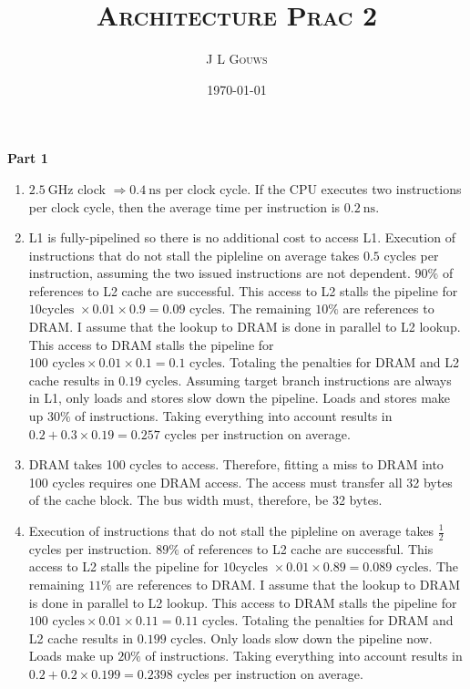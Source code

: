 \documentclass[12pt,a4]{article}
\title{
\textsc{Architecture Prac 2}
}
\author{\textsc{J L Gouws}
}
\date{\today
\\[1cm]}
\begin{document}
\thispagestyle{empty}

\maketitle

\textbf{Part 1}
\begin{enumerate}
  \item
    $\SI{2.5}{\giga\hertz}$ clock $\Rightarrow \SI{0.4}{\nano\second}$ per clock cycle.
    If the CPU executes two instructions per clock cycle, then the average time per instruction is $\SI{0.2}{\nano\second}$.
  \item
    L1 is fully-pipelined so there is no additional cost to access L1.
    Execution of instructions that do not stall the pipleline on average takes $0.5$ cycles per instruction, assuming the two issued instructions are not dependent.
    $90 \%$ of references to L2 cache are successful.
    This access to L2 stalls the pipeline for $10 \text{cycles } \times 0.01 \times 0.9 = 0.09 \text{ cycles}$.
    The remaining $10 \%$ are references to DRAM.
    I assume that the lookup to DRAM is done in parallel to L2 lookup.
    This access to DRAM stalls the pipeline for $100 \text{ cycles} \times 0.01 \times 0.1 = 0.1\text{ cycles}$.
    Totaling the penalties for DRAM and L2 cache results in $0.19 \text{ cycles}$.
    Assuming target branch instructions are always in L1, only loads and stores slow down the pipeline.
    Loads and stores make up $30 \%$ of instructions.
    Taking everything into account results in $0.2 + 0.3 \times 0.19 = 0.257$ cycles per instruction on average.
  \item
    DRAM takes 100 cycles to access. 
    Therefore, fitting a miss to DRAM into 100 cycles requires one DRAM access.
    The access must transfer all 32 bytes of the cache block.
    The bus width must, therefore, be 32 bytes.
  \item
    Execution of instructions that do not stall the pipleline on average takes $\frac{1}{2}$ cycles per instruction.
    $89 \%$ of references to L2 cache are successful.
    This access to L2 stalls the pipeline for $10 \text{cycles } \times 0.01 \times 0.89 = 0.089 \text{ cycles}$.
    The remaining $11 \%$ are references to DRAM.
    I assume that the lookup to DRAM is done in parallel to L2 lookup.
    This access to DRAM stalls the pipeline for $100 \text{ cycles} \times 0.01 \times 0.11 = 0.11 \text{ cycles}$.
    Totaling the penalties for DRAM and L2 cache results in $0.199 \text{ cycles}$.
    Only loads slow down the pipeline now.
    Loads make up $20 \%$ of instructions.
    Taking everything into account results in $0.2 + 0.2 \times 0.199 = 0.2398$ cycles per instruction on average.

\end{enumerate}
\end{document}
